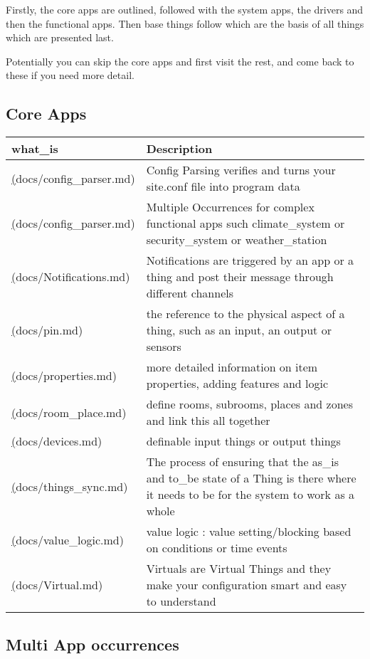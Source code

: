 Firstly, the core apps are outlined, followed with the system apps, the
drivers and then the functional apps. Then base things follow which are
the basis of all things which are presented last.

Potentially you can skip the core apps and first visit the rest, and
come back to these if you need more detail.

\subsection{Core Apps}

\begin{tabular}{ l l }
what\_is & Description \\
\hline
\href{config\_parser} (docs/config\_parser.md) & Config Parsing verifies and turns your site.conf file into program data \\
\href{multi\_app} (docs/config\_parser.md) & Multiple Occurrences for complex functional apps such climate\_system or security\_system or weather\_station \\
\href{notifications} (docs/Notifications.md) & Notifications are triggered by an app or a thing and post their message through different channels \\
\href{pin\_definitions} (docs/pin.md) & the reference to the physical aspect of a thing, such as an input, an output or sensors \\
\href{properties} (docs/properties.md) & more detailed information on item properties, adding features and logic \\
\href{rooms\_places} (docs/room\_place.md) & define rooms, subrooms, places and zones and link this all together \\
\href{things} (docs/devices.md) & definable input things or output things \\
\href{things\_sync} (docs/things\_sync.md) & The process of ensuring that the as\_is and to\_be state of a Thing is there where it needs to be for the system to work as a whole \\
\href{value\_logic} (docs/value\_logic.md) & value logic : value setting/blocking based on conditions or time events \\
\href{virtual} (docs/Virtual.md) & Virtuals are Virtual Things and they make your configuration smart and easy to understand \\
\end{tabular}

\subsection{Multi App occurrences}

